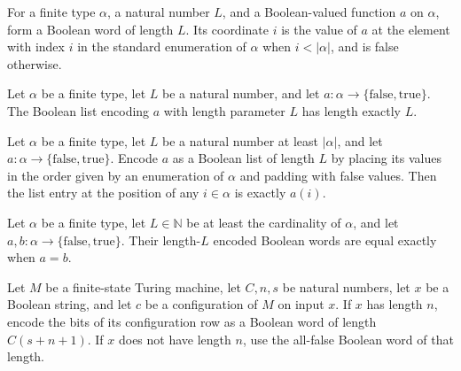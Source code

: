\begin{definition}
\label{Complexity.codecWord}
\leanok
For a finite type $\alpha$, a natural number $L$, and a Boolean-valued function $a$ on
$\alpha$, form a Boolean word of length $L$. Its coordinate $i$ is the value of $a$ at
the element with index $i$ in the standard enumeration of $\alpha$ when $i<|\alpha|$,
and is false otherwise.
\end{definition}

\begin{theorem}
\label{Complexity.codecWord_length}
\leanok
{}
Let $\alpha$ be a finite type, let $L$ be a natural number, and let
$a\colon\alpha\to\{\mathrm{false},\mathrm{true}\}$. The Boolean list encoding $a$ with
length parameter $L$ has length exactly $L$.
\end{theorem}

\begin{theorem}
\label{Complexity.codecWord_get}
\leanok
{}
Let $\alpha$ be a finite type, let $L$ be a natural number at least $|\alpha|$, and let
$a\colon\alpha\to\{\mathrm{false},\mathrm{true}\}$. Encode $a$ as a Boolean list of
length $L$ by placing its values in the order given by an enumeration of $\alpha$ and
padding with false values. Then the list entry at the position of any $i\in\alpha$ is
exactly $a(i)$.
\end{theorem}

\begin{theorem}
\label{Complexity.codecWord_eq_iff}
\leanok
{}
Let $\alpha$ be a finite type, let $L\in\mathbb{N}$ be at least the cardinality of
$\alpha$, and let $a,b:\alpha\to\{\mathrm{false},\mathrm{true}\}$. Their length-$L$
encoded Boolean words are equal exactly when $a=b$.
\end{theorem}

\begin{definition}
\label{Complexity.configurationCodec}
\leanok
{}
Let $M$ be a finite-state Turing machine, let $C,n,s$ be natural numbers, let $x$ be a
Boolean string, and let $c$ be a configuration of $M$ on input $x$. If $x$ has length
$n$, encode the bits of its configuration row as a Boolean word of length $C(s+n+1)$. If
$x$ does not have length $n$, use the all-false Boolean word of that length.
\end{definition}

